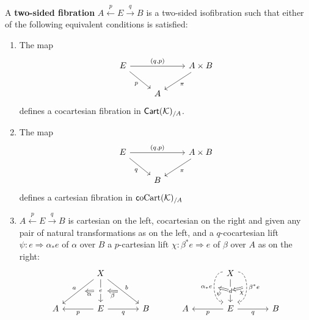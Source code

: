 \documentclass[10pt,a4paper]{article}
\newcommand{\ca}[1]{\mathcal{#1}}
\newcommand{\cat}[1]{\textcat{#1}}
\newcommand{\textcat}[1]{{\normalfont\textsf{#1}}}
\newcommand{\To}{\Rightarrow}
\DeclareMathOperator{\Cart}{\cat{Cart}}
\DeclareMathOperator{\coCart}{\cat coCart}
\theoremstyle{plain}
\theoremstyle{definition}
\theoremstyle{remark}
\begin{document}
\begin{definition}
    A \textbf{two-sided fibration} $A \xleftarrow{p} E \xrightarrow{q} B$ is a two-sided isofibration such that either of the following equivalent conditions is satisfied:
    \begin{enumerate}
        \item The map
            \[\begin{tikzcd}
                \ar[dr, "p"'] E \ar[rr, "{(q, p)}"] && A\times B \ar[dl, "\pi"]\\
                                                    & A
            \end{tikzcd}\]
            defines a cocartesian fibration in $\Cart(\ca K)_{/A}$.
        \item The map
            \[\begin{tikzcd}
                \ar[dr, "q"'] E \ar[rr, "{(q, p)}"] && A\times B \ar[dl, "\pi"]\\
                                                    & B
            \end{tikzcd}\]
            defines a cartesian fibration in $\coCart(\ca K)_{/A}$
        \item $A \xleftarrow{p} E \xrightarrow{q} B$ is cartesian on the left, cocartesian on the right and given any pair of natural transformations as on the left, and a $q$-cocartesian lift $\psi : e \To \alpha_*e$ of $\alpha$ over $B$ a $p$-cartesian lift $\chi : \beta^*e\To e$ of $\beta$ over $A$ as on the right:
            \[\begin{tikzcd}[sep=large]
                & \ar[dl, "a"', ""{anchor=center,name=a}] X \ar[d, "e"{description}, ""{anchor=center,name=e}] \ar[dr, "b", ""{anchor=center,name=b,inner sep=0}] &\\
                A & \ar[l, "p"] E \ar[r, "q"'] & B
                \ar[from=e, to=a, Rightarrow, shorten=2mm, "\alpha"] \ar[from=b, to=e, Rightarrow, shorten=2mm, "\beta"]
                \end{tikzcd}
                \hspace{3em}
                \begin{tikzcd}[sep=large]
                & \ar[d, bend right=90, dashed, "\alpha_*e"', end anchor=north west, ""{anchor=west,name=ae}] X \ar[d, "d"{description}, ""{anchor=center,name=m}] \ar[d, bend left=90, dashed, "\beta^*e", end anchor=north east, ""{anchor=east,name=be}] &\\
                A & \ar[l, "p"] E \ar[r, "q"'] & B
                \ar[from=m, to=ae, Rightarrow, "\psi"] \ar[from=be, to=m, Rightarrow, "\chi"]

\end{tikzcd}\]
\end{enumerate}
\end{definition}
\end{document}
